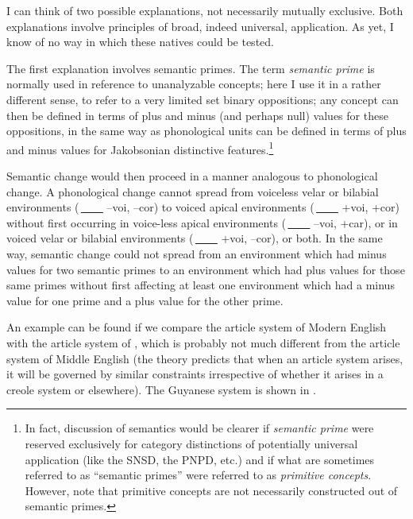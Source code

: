 I can think of two possible explanations, not necessarily mutually exclusive. Both explanations involve principles of broad, indeed universal, application. As yet, I know of no way in which these natives could be tested.

The first explanation involves semantic primes. The term \textit{semantic prime} is normally used in reference to unanalyzable concepts; here I use it in a rather different sense, to refer to a very limited set binary oppositions; any concept can then be defined in terms of plus and minus (and perhaps null) values for these oppositions, in the same way as phonological units can be defined in terms of plus and minus values for Jakobsonian distinctive features.\footnote{In fact, discussion of semantics would be clearer if \textit{semantic prime} were reserved exclusively for category distinctions of potentially universal application (like the SNSD, the PNPD, etc.) and if what are sometimes referred to as ``semantic primes'' were referred to as \textit{primitive concepts}. However, note that primitive concepts are not necessarily constructed out of semantic primes.}

Semantic change would then proceed in a manner analogous to phonological change. A phonological change cannot spread from voiceless velar or bilabial environments (\,\underline{~~~~} --voi, --cor) to voiced apical environments (\,\underline{~~~~} +voi, +cor) without first occurring in voice-less apical environments (\,\underline{~~~~} --voi, +car), or in voiced velar or bilabial environments (\,\underline{~~~~} +voi, --cor), or both. In the same way, semantic change could not spread from an environment which had minus values for two semantic primes to an environment which had plus values for those same primes without first affecting at least one environment which had a minus value for one prime and a plus value for the other prime.

An example can be found if we compare the article system of Modern English with the article system of , which is probably not much different from the article system of Middle English (the theory predicts that when an article system arises, it will be governed by similar constraints irrespective of whether it arises in a creole system or elsewhere). The Guyanese system is shown in . %

